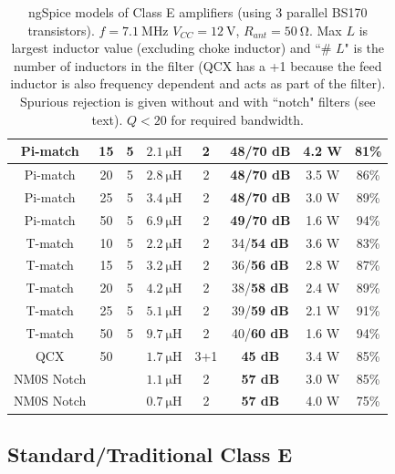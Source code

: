 \documentclass[10pt,letterpaper]{article}
\begin{document}
\begin{table}
\begin{tabular}{ccc|ccccc}
Pi-match & 15 & 5 & $\SI{2.1}{\micro\henry}$ & 2 & \textbf{48/70 dB} & 4.2 W & 81\%\\ \hline 
Pi-match & 20 & 5 & $\SI{2.8}{\micro\henry}$ & 2 & \textbf{48/70 dB} & 3.5 W & 86\%\\ \hline 
Pi-match & 25 & 5 & $\SI{3.4}{\micro\henry}$ & 2 & \textbf{48/70 dB} & 3.0 W & 89\%\\ \hline
Pi-match & 50 & 5 & $\SI{6.9}{\micro\henry}$ & 2 & \textbf{49/70 dB} & 1.6 W & 94\%\\ \hline 
T-match & 10 & 5 & $\SI{2.2}{\micro\henry}$ & 2 & 34/\textbf{54 dB} & 3.6 W & 83\%\\ \hline 
T-match & 15 & 5 & $\SI{3.2}{\micro\henry}$ & 2 & 36/\textbf{56 dB} & 2.8 W & 87\%\\ \hline 
T-match & 20 & 5 & $\SI{4.2}{\micro\henry}$ & 2 & 38/\textbf{58 dB} & 2.4 W & 89\%\\ \hline 
T-match & 25 & 5 & $\SI{5.1}{\micro\henry}$ & 2 & 39/\textbf{59 dB} & 2.1 W & 91\%\\ \hline
T-match & 50 & 5 & $\SI{9.7}{\micro\henry}$ & 2 & 40/\textbf{60 dB} & 1.6 W & 94\%\\ \hline 
QCX & 50 &  & $\SI{1.7}{\micro\henry}$ & 3+1 & \textbf{45 dB} & 3.4 W & 85\%\\ \hline 
NM0S Notch &  &  & $\SI{1.1}{\micro\henry}$ & 2 & \textbf{57 dB} & 3.0 W & 85\%\\ \hline
NM0S Notch &  &  & $\SI{0.7}{\micro\henry}$ & 2 & \textbf{57 dB} & 4.0 W & 75\%\\ \hline 
\end{tabular}
\caption{ngSpice models of Class E amplifiers (using 3 parallel BS170 transistors). $f=\SI{7.1}{\mega\hertz}$ $V_{CC}=\SI{12}{\volt}$, $R_{ant}=\SI{50}{\ohm}$. Max $L$ is largest inductor value (excluding choke inductor) and ``\# $L$" is the number of inductors in the filter (QCX has a +1 because the feed inductor is also frequency dependent and acts as part of the filter). Spurious rejection is given without and with ``notch" filters (see text). $Q<20$ for required bandwidth.}\label{comparetable}
\end{table}



\subsection{Standard/Traditional Class E}
\end{document}
